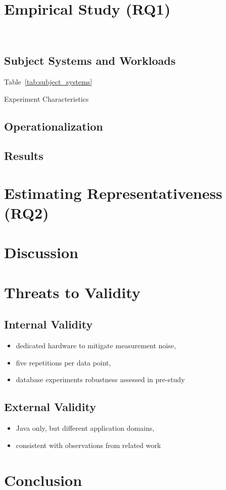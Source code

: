 \section{Empirical Study (RQ1)}~\label{sec:study}
\subsection{Subject Systems and Workloads}
Table~\ref{tab:subject_systems}
\begin{table*}
	\centering
	\caption{Experiment Characteristics}
	
	\label{tab:subject_systems}
\end{table*}

\subsection{Operationalization}
\subsection{Results}

\section{Estimating Representativeness (RQ2)}

\section{Discussion}

\section{Threats to Validity}
\subsection{Internal Validity}
\begin{itemize}
	\item dedicated hardware to mitigate measurement noise, 
	\item five repetitions per data point, 
	\item database experiments robustness assessed in pre-study
\end{itemize}
\subsection{External Validity}
\begin{itemize}
	\item Java only, but different application domains,
	\item consistent with observations from related work
\end{itemize}
\section{Conclusion}
